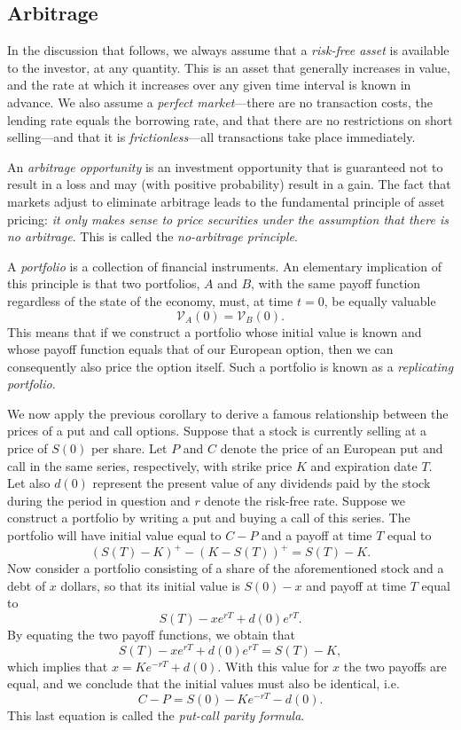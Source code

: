 \documentclass[]{article}
\theoremstyle{definition}
\theoremstyle{remark}
\begin{document}
\subsection{Arbitrage}
In the discussion that follows, we always assume that a \textit{risk-free asset} is available to the investor, at any quantity. This is an asset that generally increases in value, and the rate at which it increases over any given time interval is known in advance. We also assume a \textit{perfect market}---there are no transaction costs, the lending rate equals the borrowing rate, and that there are no restrictions on short selling---and that it is \textit{frictionless}---all transactions take place immediately.
\par
An \textit{arbitrage opportunity} is an investment opportunity that is guaranteed not to result in a loss and may (with positive probability) result in a gain. The fact that markets adjust to eliminate arbitrage leads to the fundamental principle of asset pricing: \textit{it only makes sense to price securities under the assumption that there is no arbitrage}. This is called the \textit{no-arbitrage principle}.
\par 
A \textit{portfolio} is a collection of financial instruments. An elementary implication of this principle is that two portfolios, $A$ and $B$, with the same payoff function regardless of the state of the economy, must, at time $t=0$, be equally valuable~\cite{roman2013introduction}
\[\mathcal{V}_{A}(0) = \mathcal{V}_B (0). \]
This means that if we construct a portfolio whose initial value is known and whose payoff function equals that of our European option, then we can consequently also price the option itself. Such a portfolio is known as a \textit{replicating portfolio}.
\par We now apply the previous corollary to derive a famous relationship between the prices of a put and call options. Suppose that a stock is currently selling at a price of $S(0)$ per share. Let $P$ and $C$ denote the price of an European put and call in the same series, respectively, with strike price $K$ and expiration date $T$. Let also $d(0)$ represent the present value of any dividends paid by the stock during the period in question and $r$ denote the risk-free rate. Suppose we construct a portfolio by writing a put and buying a call of this series. The portfolio will have initial value equal to $C-P$ and a payoff at time $T$ equal to
\[(S(T) - K)^+ -(K-S(T))^+ = S(T)-K.\]
Now consider a portfolio consisting of a share of the aforementioned stock and a debt of $x$ dollars, so that its initial value is $S(0)-x$ and payoff at time $T$ equal to
\[  S(T) - x e^{rT} +d(0) e^{r T}. \]
By equating the two payoff functions, we obtain that
\[
S(T) - x e^{rT} +d(0) e^{r T} = S(T) - K,
\]
which implies that $x=K e^{-rT} + d(0)$. With this value for $x$ the two payoffs are equal, and we conclude that the initial values must also be identical, i.e.
\[ C-P = S(0) - Ke^{-rT} - d(0). \]
This last equation is called the \textit{put-call parity formula}.
\end{document}
